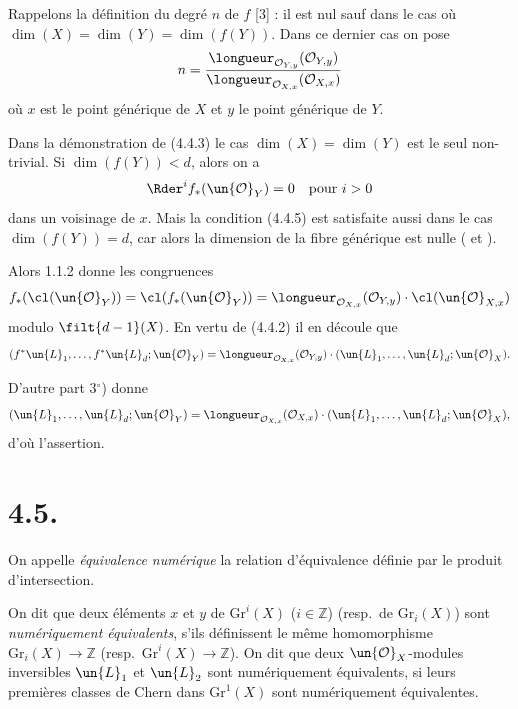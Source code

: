 Rappelons la d\'efinition du degr\'e $n$ de $f$ [3] : il est nul sauf dans le cas o\`u $\dim(X) = \dim(Y) = \dim(f(Y))$. Dans ce dernier cas on pose
\begin{equation}\label{eq:4.4.4}
n = \frac{\longueur_{\mathcal{O}_{Y,y}}(\mathcal{O}_{Y,y})}{\longueur_{\mathcal{O}_{X,x}}(\mathcal{O}_{X,x})}
\end{equation}
o\`u $x$ est le point g\'en\'erique de $X$ et $y$ le point g\'en\'erique de $Y$.

Dans la d\'emonstration de (4.4.3) le cas $\dim(X) = \dim(Y)$ est le seul non-trivial. Si $\dim(f(Y)) < d$, alors on a
\begin{equation}\label{eq:4.4.5}
\Rder^{i}f_{*}(\un{\mathcal{O}}_{Y}) = 0 \quad \text{pour } i > 0
\end{equation}
dans un voisinage de $x$. Mais la condition (4.4.5) est satisfaite aussi dans le cas $\dim(f(Y)) = d$, car alors la dimension de la fibre g\'en\'erique est nulle ( et ).

Alors 1.1.2 donne les congruences
\[
f_{*}(\cl(\un{\mathcal{O}}_{Y})) = \cl(f_{*}(\un{\mathcal{O}}_{Y})) = \longueur_{\mathcal{O}_{X,x}}(\mathcal{O}_{Y,y}) \cdot \cl(\un{\mathcal{O}}_{X,x})
\]
modulo $\filt{d-1}(X)$. En vertu de (4.4.2) il en d\'ecoule que
\[
(f^{*}\un{L}_{1}, \dots, f^{*}\un{L}_{d}; \un{\mathcal{O}}_{Y}) = \longueur_{\mathcal{O}_{X,x}}(\mathcal{O}_{Y,y}) \cdot (\un{L}_{1}, \dots, \un{L}_{d}; \un{\mathcal{O}}_{X}).
\]

D'autre part 3$^{\circ}$) donne
\[
(\un{L}_{1}, \dots, \un{L}_{d}; \un{\mathcal{O}}_{Y}) = \longueur_{\mathcal{O}_{X,x}}(\mathcal{O}_{X,x}) \cdot (\un{L}_{1}, \dots, \un{L}_{d}; \un{\mathcal{O}}_{X}),
\]
d'o\`u l'assertion.

\section*{4.5.}

On appelle \emph{\'equivalence num\'erique} la relation d'\'equivalence d\'efinie par le produit d'intersection.

\begin{definition}[4.5.1]
On dit que deux \'el\'ements $x$ et $y$ de $\mathrm{Gr}^{i}(X)$ ($i \in \mathbb{Z}$) (resp.\ de $\mathrm{Gr}_{i}(X)$) sont \emph{num\'eriquement \'equivalents}, s'ils d\'efinissent le m\^eme homomorphisme $\mathrm{Gr}_{i}(X) \to \mathbb{Z}$ (resp.\ $\mathrm{Gr}^{i}(X) \to \mathbb{Z}$). On dit que deux $\un{\mathcal{O}}_{X}$-modules inversibles $\un{L}_{1}$ et $\un{L}_{2}$ sont num\'eriquement \'equivalents, si leurs premi\`eres classes de Chern dans $\mathrm{Gr}^{1}(X)$ sont num\'eriquement \'equivalentes.
\end{definition}

